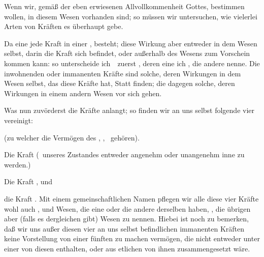 \begin{aufza}
\item Wenn wir, gemäß der eben erwiesenen Allvollkommenheit Gottes, bestimmen wollen,  in diesem Wesen vorhanden sind; so müssen wir untersuchen, wie vielerlei Arten von Kräften es überhaupt gebe.
\item Da eine jede Kraft in einer , besteht; diese Wirkung aber entweder in dem Wesen selbst, darin die Kraft sich befindet, oder außerhalb des Wesens zum Vorschein kommen kann: so unterscheide ich~\ zuerst , deren eine ich , die andere  nenne. Die inwohnenden oder immanenten Kräfte sind solche, deren Wirkungen in dem Wesen selbst, das diese Kräfte hat, Statt finden; die  dagegen solche, deren Wirkungen in einem andern Wesen vor sich gehen.
\item Was nun zuvörderst die  Kräfte anlangt; so finden wir an uns selbst folgende vier vereinigt:
\begin{aufzb}
\item {} (zu welcher die Vermögen des , ,  \udgl\ gehören).
\item Die Kraft  (\dh\ unseres Zustandes entweder angenehm oder unangenehm inne zu werden.)
\item Die Kraft , und
\item die Kraft . Mit einem gemeinschaftlichen Namen pflegen wir alle diese vier Kräfte wohl auch , und Wesen, die eine oder die andere derselben haben, , die übrigen aber (falls es dergleichen gibt)  Wesen zu nennen. Hiebei ist noch zu bemerken, daß wir uns außer diesen vier an uns selbst befindlichen immanenten Kräften keine Vorstellung von einer fünften zu machen vermögen, die nicht entweder unter einer von diesen enthalten, oder aus etlichen von ihnen zusammengesetzt wäre.
\end{aufzb}

\end{aufza}
